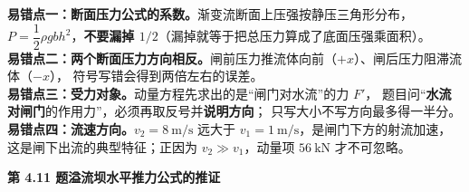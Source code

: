 \begin{yicuo}
\textbf{易错点一：断面压力公式的系数。}渐变流断面上压强按静压三角形分布，
$P=\dfrac{1}{2}\rho gbh^2$，\textbf{不要漏掉 $1/2$}（漏掉就等于把总压力算成了底面压强乘面积）。\\
\textbf{易错点二：两个断面压力方向相反。}闸前压力推流体向前（$+x$）、闸后压力阻滞流体（$-x$），
符号写错会得到两倍左右的误差。\\
\textbf{易错点三：受力对象。}动量方程先求出的是“闸门对水流”的力 $F'$，
题目问“\textbf{水流对闸门}的作用力”，必须再取反号并\textbf{说明方向}；
只写大小不写方向最多得一半分。\\
\textbf{易错点四：流速方向。}$v_2=8\ \mathrm{m/s}$ 远大于 $v_1=1\ \mathrm{m/s}$，是闸门下方的射流加速，
这是闸下出流的典型特征；正因为 $v_2\gg v_1$，动量项 $56\ \mathrm{kN}$ 才不可忽略。
\end{yicuo}

\noindent\textbf{第 4.11 题\quad 溢流坝水平推力公式的推证}

